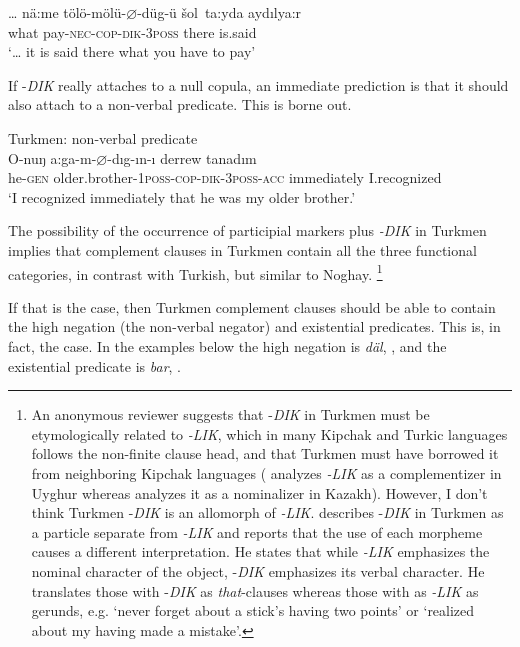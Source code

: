 \documentclass[output=paper]{langsci/langscibook}
\begin{document}
\ea%
    \label{kelepirex:key:23}
    \gll \ldots{} nä:me tölö-mölü-$\varnothing$-düg-ü šol~ta:yda aydılya:r \\
    {} what pay-\textsc{nec}-\textsc{cop}-\textsc{dik}-\textsc{3poss} there is.said \\
    \glt `\ldots{} it is said there what you have to pay' 
\z

If -\textit{DIK} really attaches to a null copula, an immediate prediction is that it should also attach to a non-verbal predicate. 
This is borne out.

\ea Turkmen: non-verbal predicate \\%
    \label{kelepirex:key:24}
    \gll O-nuŋ a:ga-m-$\varnothing$-dıg-ın-ı derrew tanadım\\
    he-\textsc{gen}  older.brother-1\textsc{poss}-\textsc{cop}{}-\textsc{dik}{}-\textsc{3poss-acc} immediately I.recognized\\
    \glt `I recognized immediately that he was my older brother.'
\z

The possibility of the occurrence of participial markers plus \textit{-DIK} in Turkmen implies that complement clauses in Turkmen contain all the three functional categories, in contrast with Turkish, but similar to Noghay.%
    \footnote{
        An anonymous reviewer suggests that -\textit{DIK} in Turkmen must be etymologically related to \textit{-LIK}, which in many Kipchak and Turkic languages follows the non-finite clause head, and that Turkmen must have borrowed it from neighboring Kipchak languages 
        (\citet{Asarina2011} analyzes \textit{-LIK} as a complementizer in Uyghur whereas \citet{OtottKovacs2018} analyzes it as a nominalizer in Kazakh).
        However, I don't think Turkmen -\textit{DIK} is an allomorph of \textit{{}-LIK}.
        \citet[480--483]{Clark1998} describes -\textit{DIK} in Turkmen as a particle separate from \textit{{}-LIK} and reports that the use of each morpheme causes a different interpretation. 
        He states that while \textit{{}-LIK} emphasizes the nominal character of the object, -\textit{DIK} emphasizes its verbal character. 
        He translates those with -\textit{DIK} as \textit{that}{}-clauses whereas those with as \textit{{}-LIK} as gerunds, 
        e.g. `never forget about a stick's having two points' or `realized about my having made a mistake'.
    }  

\newpage

If that is the case, then Turkmen complement clauses should be able to contain the high negation (the non-verbal negator) and existential predicates. 
This is, in fact, the case. 
In the examples below the high negation is \textit{däl}, , and the existential predicate is \textit{bar}, .
\end{document}
